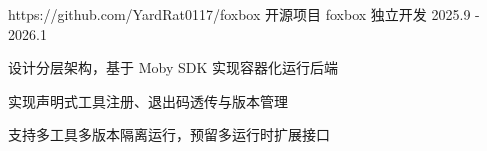 
\begin{cventries}

\cventry
    {https://github.com/YardRat0117/foxbox}
    {开源项目 foxbox}
    {独立开发}
    {2025.9 - 2026.1}
    {
        \begin{cvitems}
            \item {设计分层架构，基于 Moby SDK 实现容器化运行后端}
            \item {实现声明式工具注册、退出码透传与版本管理}
            \item {支持多工具多版本隔离运行，预留多运行时扩展接口}
        \end{cvitems}
    }
\end{cventries}
